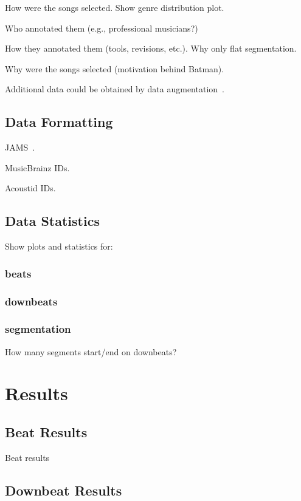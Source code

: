 \documentclass{article}
\newcommand{\setName}{Batman}
\begin{document}
How were the songs selected. Show genre distribution plot.

Who annotated them (e.g., professional musicians?)

How they annotated them (tools, revisions, etc.). Why only flat segmentation.

Why were the songs selected (motivation behind \setName).

Additional data could be obtained by data augmentation~\cite{Mcfee2015}.

\subsection{Data Formatting}

JAMS~\cite{Humphrey2014}.

MusicBrainz IDs.

Acoustid IDs.

\subsection{Data Statistics}

Show plots and statistics for: 

\subsubsection{beats}

\subsubsection{downbeats}

\subsubsection{segmentation}

How many segments start/end on downbeats?

\section{Results}\label{sec:results}

\subsection{Beat Results}

Beat results

\subsection{Downbeat Results}
\end{document}
